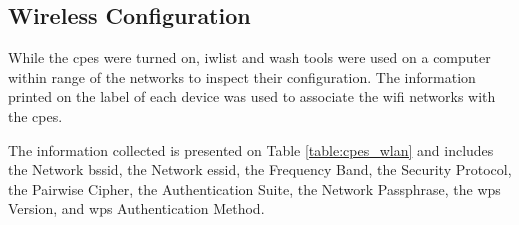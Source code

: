 \begin{landscape}

\subsection{Wireless Configuration}

While the \glspl{cpe} were turned on, iwlist and wash tools were used on a computer within range of the networks to inspect their configuration. The information printed on the label of each device was used to associate the \gls{wifi} networks with the \gls{cpe}s.

The information collected is presented on Table \ref{table:cpes_wlan} and includes the Network \gls{bssid}, the Network \gls{essid}, the Frequency Band, the Security Protocol, the Pairwise Cipher, the Authentication Suite, the Network Passphrase, the \gls{wps} Version, and \gls{wps} Authentication Method.


\end{landscape}

